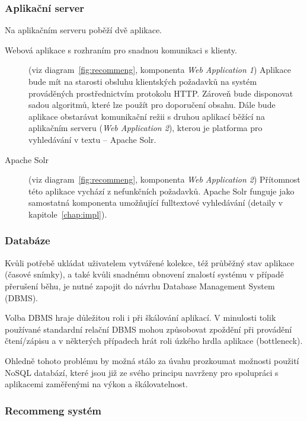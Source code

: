 \documentclass[thesis=M,czech]{FITthesis}[2014/05/07]
\begin{document}
\subsubsection{Aplikační server}

Na aplikačním serveru poběží dvě aplikace. 

\begin{description}
	\item[Webová aplikace s rozhraním pro snadnou komunikaci s klienty.]
	(viz diagram~\ref{fig:recommeng}, komponenta \emph{Web Application 1}) Aplikace bude mít na starosti obsluhu klientských požadavků na systém prováděných prostřednictvím protokolu HTTP. Zároveň bude disponovat sadou algoritmů, které lze použít pro doporučení obsahu. Dále bude aplikace obstarávat komunikační režii s druhou aplikací běžící na aplikačním serveru (\emph{Web Application 2}), kterou je platforma pro vyhledávání v textu – Apache Solr.

	\item[Apache Solr]
	(viz diagram~\ref{fig:recommeng}, komponenta \emph{Web Application 2}) Přítomnost této aplikace vychází z nefunkčních požadavků. Apache Solr funguje jako samostatná komponenta umožňující fulltextové vyhledávání (detaily v kapitole~\ref{chap:impl}).
\end{description}

\subsubsection{Databáze}

Kvůli potřebě ukládat uživatelem vytvářené kolekce, též průběžný stav aplikace (časové snímky), a také kvůli snadnému obnovení znalostí systému v případě přerušení běhu, je nutné zapojit do návrhu Database Management System (DBMS).

Volba DBMS hraje důležitou roli i při škálování aplikací. V minulosti tolik používané standardní relační DBMS mohou způsobovat zpoždění při provádění čtení/zápisu a v některých případech hrát roli úzkého hrdla aplikace (bottleneck).

Ohledně tohoto problému by možná stálo za úvahu prozkoumat možnosti použití NoSQL databází, které jsou již ze svého principu navrženy pro spolupráci s aplikacemi zaměřenými na výkon a škálovatelnost.

\subsubsection{Recommeng systém}
\end{document}
